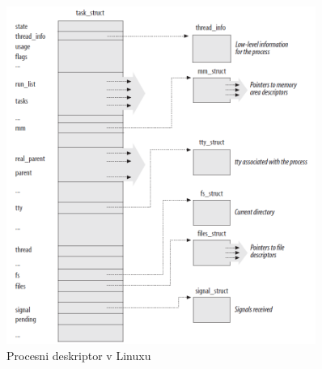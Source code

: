 \documentclass[a4paper,12pt,openright]{book}
\begin{document}
\begin{figure}[h!]
	\begin{center}
		\includegraphics[width=0.9\textwidth]{images/linux_process_descriptor.png}
	\end{center}
	\caption{Procesni deskriptor v Linuxu \cite{Bovet_Cesati_2005}}
	\label{fig:linux_process_descriptor}
\end{figure}
\end{document}
